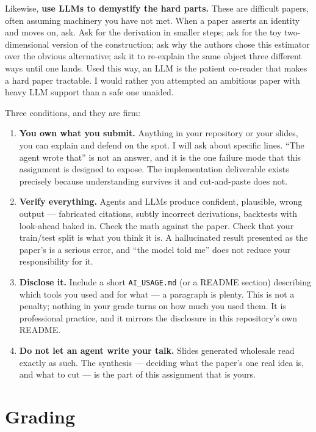\documentclass[11pt]{article}
\begin{document}
Likewise, \textbf{use LLMs to demystify the hard parts.} These are difficult
papers, often assuming machinery you have not met. When a paper asserts an
identity and moves on, ask. Ask for the derivation in smaller steps; ask for
the toy two-dimensional version of the construction; ask why the authors chose
this estimator over the obvious alternative; ask it to re-explain the same
object three different ways until one lands. Used this way, an LLM is the
patient co-reader that makes a hard paper tractable. I would rather you
attempted an ambitious paper with heavy LLM support than a safe one unaided.

Three conditions, and they are firm:

\begin{enumerate}
  \item \textbf{You own what you submit.} Anything in your repository or your
    slides, you can explain and defend on the spot. I will ask about specific
    lines. ``The agent wrote that'' is not an answer, and it is the one failure
    mode that this assignment is designed to expose. The implementation
    deliverable exists precisely because understanding survives it and
    cut-and-paste does not.
  \item \textbf{Verify everything.} Agents and LLMs produce confident,
    plausible, wrong output --- fabricated citations, subtly incorrect
    derivations, backtests with look-ahead baked in. Check the math against the
    paper. Check that your train/test split is what you think it is. A
    hallucinated result presented as the paper's is a serious error, and
    ``the model told me'' does not reduce your responsibility for it.
  \item \textbf{Disclose it.} Include a short \texttt{AI\_USAGE.md} (or a
    README section) describing which tools you used and for what --- a
    paragraph is plenty. This is not a penalty; nothing in your grade turns on
    how much you used them. It is professional practice, and it mirrors the
    disclosure in this repository's own README.
  \item \textbf{Do not let an agent write your talk.} Slides generated
    wholesale read exactly as such. The synthesis --- deciding what the
    paper's one real idea is, and what to cut --- is the part of this
    assignment that is yours.
\end{enumerate}

\section*{Grading}
\end{document}
